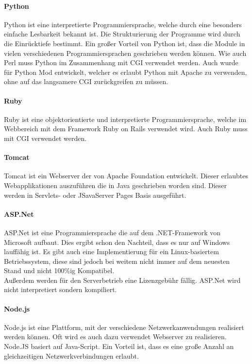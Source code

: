 \paragraph{Python}
Python ist eine interpretierte Programmiersprache, welche durch eine besonders einfache Lesbarkeit bekannt ist. Die Strukturierung der Programme wird durch die Einrücktiefe bestimmt. Ein großer Vorteil von Python ist, dass die Module in vielen verschiedenen Programmiersprachen geschrieben werden können. Wie auch Perl muss Python im Zusammenhang mit CGI verwendet werden. Auch wurde für Python Mod entwickelt, welcher es erlaubt Python mit Apache zu verwenden, ohne auf das langsamere CGI zurückgreifen zu müssen.\\
\paragraph{Ruby}
Ruby ist eine objektorientierte und interpretierte Programmiersprache, welche im Webbereich mit dem Framework Ruby on Rails verwendet wird. Auch Ruby muss mit CGI verwendet werden.
\paragraph{Tomcat}
Tomcat ist ein Webserver der von Apache Foundation entwickelt. Dieser erlaubtes Webapplikationen auszuführen die in Java geschrieben worden sind. Dieser werden in Servlets- oder JSavaServer Pages Basis ausgeführt.
\paragraph{ASP.Net}
ASP.Net ist eine Programmiersprache die auf dem .NET-Framework von Microsoft aufbaut. Dies ergibt schon den Nachteil, dass es nur auf Windows lauffähig ist. Es gibt auch eine Implementierung für ein Linux-basiertem Betriebssystem, diese sind jedoch bei weitem nicht immer auf dem neuesten Stand und nicht 100\%ig Kompatibel.\\
Außerdem werden für den Serverbetrieb eine Lizenzgebühr fällig. ASP.Net wird nicht interpretiert sondern kompiliert.
\paragraph{Node.js}
Node.js ist eine Plattform, mit der verschiedene Netzwerkanwendungen realisiert werden können. Oft wird es auch dazu verwendet Webserver zu realisieren. Node.JS basiert auf Java-Script. Ein Vorteil ist, dass es eine große Anzahl an gleichzeitigen Netzwerkverbindungen erlaubt.